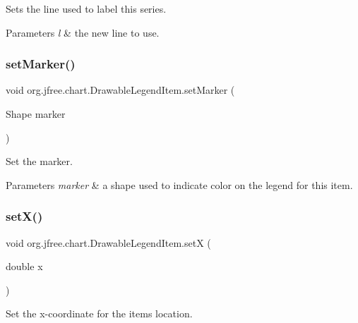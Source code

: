 Sets the line used to label this series.


\begin{DoxyParams}{Parameters}
{\em l} & the new line to use. \\
\hline
\end{DoxyParams}
\mbox{\label{classorg_1_1jfree_1_1chart_1_1_drawable_legend_item_aef283072b6a798c91a45040ffc117e8c}} 
\subsubsection{\texorpdfstring{set\+Marker()}{setMarker()}}
{\footnotesize\ttfamily void org.\+jfree.\+chart.\+Drawable\+Legend\+Item.\+set\+Marker (\begin{DoxyParamCaption}\item[{Shape}]{marker }\end{DoxyParamCaption})}

Set the marker.


\begin{DoxyParams}{Parameters}
{\em marker} & a shape used to indicate color on the legend for this item. \\
\hline
\end{DoxyParams}
\mbox{\label{classorg_1_1jfree_1_1chart_1_1_drawable_legend_item_a5f70a05cfb39b613ddfc815c2f2d2030}} 
\subsubsection{\texorpdfstring{set\+X()}{setX()}}
{\footnotesize\ttfamily void org.\+jfree.\+chart.\+Drawable\+Legend\+Item.\+setX (\begin{DoxyParamCaption}\item[{double}]{x }\end{DoxyParamCaption})}

Set the x-\/coordinate for the item\textquotesingle{}s location.


